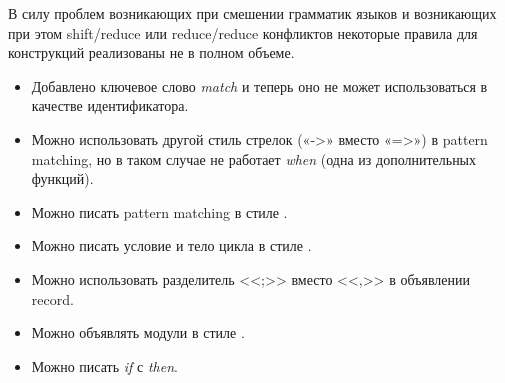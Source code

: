 В силу проблем возникающих при смешении грамматик языков и возникающих при этом shift/reduce или reduce/reduce конфликтов некоторые правила для конструкций реализованы не в полном объеме.
\begin{itemize}

\item Добавлено ключевое слово {\it match} и теперь оно не может использоваться в качестве идентификатора.

\item Можно использовать другой стиль стрелок («->» вместо «=>») в pattern matching, но в таком случае не работает {\it when} (одна из дополнительных функций).

\item Можно писать pattern matching в стиле \OCaml{}.%

\item Можно писать условие и тело цикла в стиле \OCaml{}.

\item Можно использовать разделитель <<;>> вместо <<,>> в объявлении record.

\item Можно объявлять модули в стиле \OCaml{}.

\item Можно писать {\it if} с {\it then}.

\end{itemize}

